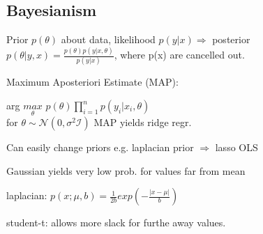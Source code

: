 \subsection{Bayesianism}

Prior $p(\theta)$ about data, likelihood $p(y|x) \Rightarrow$ posterior $p(\theta|y,x) = \frac{p(\theta) p(y|x,\theta)}{p(y|x)}$, where p(x) are cancelled out.

Maximum Aposteriori Estimate (MAP):
\begin{center}
    arg $\underset{\theta}{max}$ $p(\theta)\prod_{i=1}^n p(y_i|x_i,\theta)$
    \\ for $\theta \sim \mathcal{N}(0,\sigma^2\mathcal{I})$ MAP yields ridge regr.
\end{center}

Can easily change priors e.g. laplacian prior $\Rightarrow$ lasso OLS %

Gaussian yields very low prob. for values far from mean

laplacian: $p(x;\mu,b) = \frac{1}{2b}exp(-\frac{|x-\mu|}{b})$

student-t: allows more slack for furthe away values.